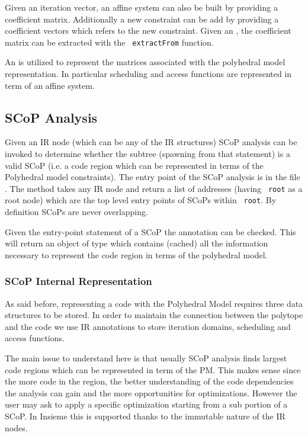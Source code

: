 Given an iteration vector, an affine system can also be built by providing a
coefficient matrix. Additionally a new constraint can be add by providing a
coefficient vectors which refers to the new constraint. Given an
, the coefficient matrix can be extracted with the {\tt
extractFrom} function. 

An  is utilized to represent the matrices associated with the
polyhedral model representation. In particular scheduling and access functions
are represented in term of an affine system. 


\subsection{SCoP Analysis}

Given an IR node (which can be any of the IR structures) SCoP analysis can be
invoked to determine whether the subtree (spawning from that statement) is a
valid SCoP (i.e. a code region which can be represented in terms of the
Polyhedral model constraints). The entry point of the SCoP analysis is in the
file . The method  takes any IR node and return a list of addresses (having {\tt
root} as a root node) which are the top level entry points of SCoPs within {\tt
root}. By definition SCoPs are never overlapping. 

Given the entry-point statement of a SCoP the  annotation can
be checked. This will return an object of type  which contains
(cached) all the information necessary to represent the code region in terms of
the polyhedral model. 

\subsubsection{SCoP Internal Representation}
As said before, representing a code with the Polyhedral Model requires three
data structures to be stored. In order to maintain the connection between the
polytope and the code we use IR annotations to store iteration domains,
scheduling and access functions. 

The main issue to understand here is that usually SCoP analysis finds largest
code regions which can be represented in term of the PM. This makes sense since
the more code in the region, the better understanding of the code dependencies
the analysis can gain and the more opportunities for optimizations. However the
user may ask to apply a specific optimization starting from a sub portion of a
SCoP. In Insieme this is supported thanks to the immutable nature of the IR
nodes. 

